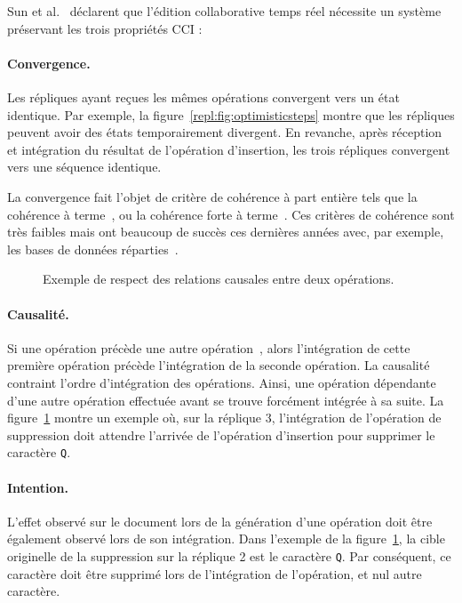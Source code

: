 Sun et al.~\cite{sun1998achieving} déclarent que l'édition collaborative temps
réel nécessite un système préservant les trois propriétés CCI :


\paragraph{Convergence.} Les répliques ayant reçues les mêmes opérations
convergent vers un état identique. Par exemple, la
figure~\ref{repl:fig:optimisticsteps} montre que les répliques peuvent avoir des
états temporairement divergent. En revanche, après réception et intégration du
résultat de l'opération d'insertion, les trois répliques convergent vers une
séquence identique.

\noindent La convergence fait l'objet de critère de cohérence à part entière
tels que la cohérence à terme~\cite{bailis2013eventual}, ou la cohérence forte à
terme~\cite{shapiro2011conflict}. Ces critères de cohérence sont très faibles
mais ont beaucoup de succès ces dernières années avec, par exemple, les bases de
données réparties~\cite{dynamo, riak, cassandra, mongodb}.


\begin{figure}
  \begin{center}
    
    \caption[Exemple de respect des relations
    causales]{\label{repl:fig:causality}Exemple de respect des relations
      causales entre deux opérations.}
  \end{center}
\end{figure}

\paragraph{Causalité.} Si une opération précède une autre
opération~\cite{lamport1978time}, alors l'intégration de cette première
opération précède l'intégration de la seconde opération.  La causalité
contraint l'ordre d'intégration des opérations. Ainsi, une opération dépendante
d'une autre opération effectuée avant se trouve forcément intégrée à sa suite.
La figure~\ref{repl:fig:causality} montre un exemple où, sur la réplique 3,
l'intégration de l'opération de suppression doit attendre l'arrivée de
l'opération d'insertion pour supprimer le caractère \texttt{Q}.



\paragraph{Intention.} L'effet observé sur le document lors de la génération
d'une opération doit être également observé lors de son intégration.  Dans
l'exemple de la figure~\ref{repl:fig:causality}, la cible originelle de la
suppression sur la réplique 2 est le caractère \texttt{Q}. Par conséquent, ce
caractère doit être supprimé lors de l'intégration de l'opération, et nul autre
caractère.


